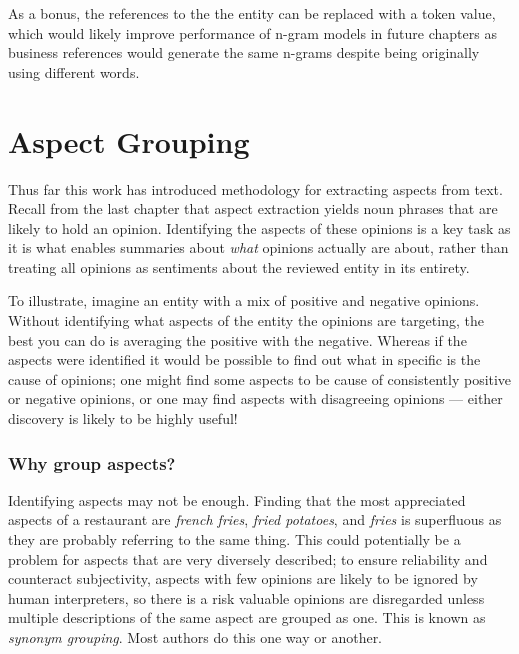 \documentclass[a4paper,11pt]{kth-mag}
\begin{document}
As a bonus, the references to the the entity can be replaced with a token value, which would likely improve
performance of n-gram models in future chapters as business references would generate the same n-grams despite being originally using different words.





\chapter{Aspect Grouping}
\label{sec:aspect_grouping}
Thus far this work has introduced methodology for extracting aspects from text.
Recall from the last chapter that aspect extraction yields noun phrases that are likely
to hold an opinion.
Identifying the aspects of these opinions is a key task as it is what enables
summaries about \emph{what} opinions actually are about, rather than treating all opinions
as sentiments about the reviewed entity in its entirety.

To illustrate, imagine an entity with a mix of positive and negative opinions.
Without identifying what aspects of the entity the opinions are targeting, the best
you can do is averaging the positive with the negative.
Whereas if the aspects were identified 
it would be possible to find out what in specific is the cause of opinions;
one might find some aspects to be cause of consistently positive or negative opinions,
or one may find aspects with disagreeing opinions
--- either discovery is likely to be highly useful!

\subsection{Why group aspects?}
Identifying aspects may not be enough. Finding that the
most appreciated aspects of a restaurant are \emph{french fries},
\emph{fried potatoes}, and \emph{fries} is superfluous as they are
probably referring to the same thing.
This could potentially be a problem for aspects that are very diversely described;
to ensure reliability and counteract subjectivity, aspects with few opinions are
likely to be ignored by human interpreters, so there is a risk valuable opinions are disregarded unless
multiple descriptions of the same aspect are grouped as one. This is known as \emph{synonym grouping}\cite{}.
Most authors do this one way or another.
\end{document}
